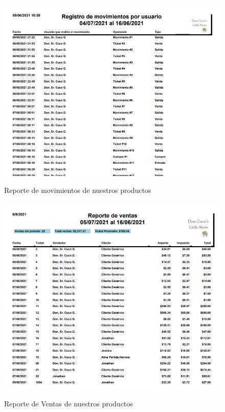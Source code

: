 \documentclass[a4paper,DIV=12]{scrreprt}
\begin{document}
		\begin{figure}[h!]
		\centering
		\includegraphics[scale=0.4]{REPORTEMOVIMIENTOS1.PNG}\\
		\caption{Reporte de movimientos de nuestros productos}
	\end{figure}
	
		\begin{figure}[h!]
		\centering
		\includegraphics[scale=0.4]{REPORTEVENTAS.PNG}\\
		\caption{Reporte de Ventas de nuestros productos}
	\end{figure}
	
\end{document}
